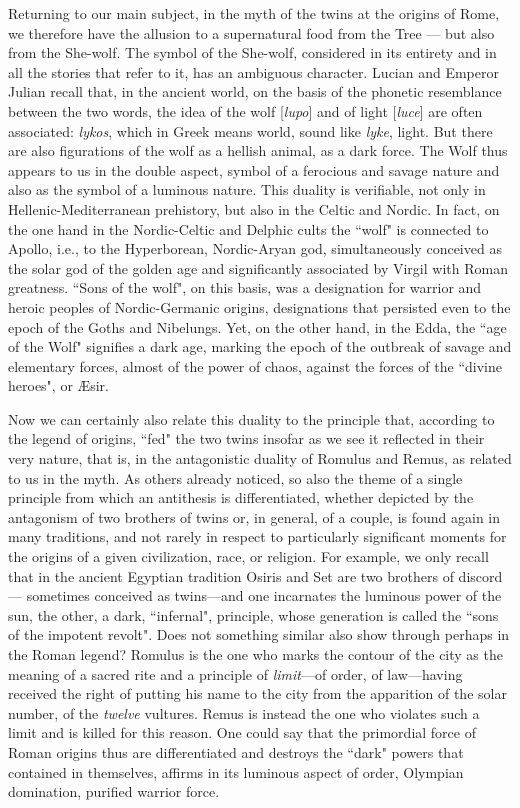Returning to our main subject, in the myth of the twins at the origins of Rome, we therefore have the allusion to a supernatural food from the Tree — but also from the She-wolf. The symbol of the She-wolf, considered in its entirety and in all the stories that refer to it, has an ambiguous character. Lucian and Emperor Julian recall that, in the ancient world, on the basis of the phonetic resemblance between the two words, the idea of the wolf [\emph{lupo}] and of light [\emph{luce}] are often associated: \emph{lykos}, which in Greek means world, sound like \emph{lyke}, light. But there are also figurations of the wolf as a hellish animal, as a dark force. The Wolf thus appears to us in the double aspect, symbol of a ferocious and savage nature and also as the symbol of a luminous nature. This duality is verifiable, not only in Hellenic-Mediterranean prehistory, but also in the Celtic and Nordic. In fact, on the one hand in the Nordic-Celtic and Delphic cults the ``wolf" is connected to Apollo, i.e., to the Hyperborean, Nordic-Aryan god, simultaneously conceived as the solar god of the golden age and significantly associated by Virgil with Roman greatness. ``Sons of the wolf", on this basis, was a designation for warrior and heroic peoples of Nordic-Germanic origins, designations that persisted even to the epoch of the Goths and Nibelungs. Yet, on the other hand, in the Edda, the ``age of the Wolf" signifies a dark age, marking the epoch of the outbreak of savage and elementary forces, almost of the power of chaos, against the forces of the ``divine heroes", or Æsir.

Now we can certainly also relate this duality to the principle that, according to the legend of origins, ``fed" the two twins insofar as we see it reflected in their very nature, that is, in the antagonistic duality of Romulus and Remus, as related to us in the myth. As others already noticed, so also the theme of a single principle from which an antithesis is differentiated, whether depicted by the antagonism of two brothers of twins or, in general, of a couple, is found again in many traditions, and not rarely in respect to particularly significant moments for the origins of a given civilization, race, or religion. For example, we only recall that in the ancient Egyptian tradition Osiris and Set are two brothers of discord — sometimes conceived as twins—and one incarnates the luminous power of the sun, the other, a dark, ``infernal", principle, whose generation is called the ``sons of the impotent revolt". Does not something similar also show through perhaps in the Roman legend? Romulus is the one who marks the contour of the city as the meaning of a sacred rite and a principle of \emph{limit}—of order, of law—having received the right of putting his name to the city from the apparition of the solar number, of the \emph{twelve} vultures. Remus is instead the one who violates such a limit and is killed for this reason. One could say that the primordial force of Roman origins thus are differentiated and destroys the ``dark" powers that contained in themselves, affirms in its luminous aspect of order, Olympian domination, purified warrior force.

